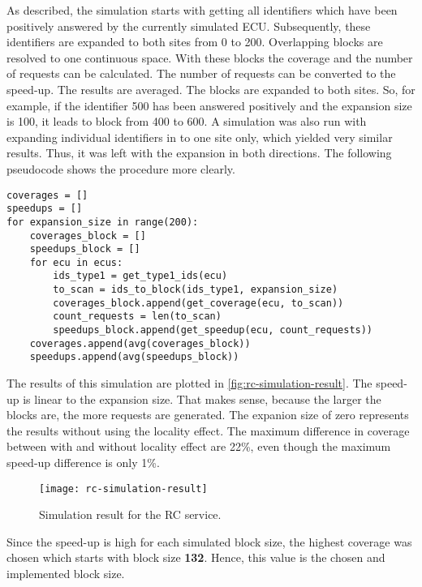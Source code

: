 As described, the simulation starts with getting all identifiers which have been positively answered by the currently simulated ECU. Subsequently, these identifiers are expanded to both sites from 0 to 200. Overlapping blocks are resolved to one continuous space. With these blocks the coverage and the number of requests can be calculated. The number of requests can be converted to the speed-up. The results are averaged.
The blocks are expanded to both sites. So, for example, if the identifier 500 has been answered positively and the expansion size is 100, it leads to block from 400 to 600. A simulation was also run with expanding individual identifiers in to one site only, which yielded very similar results. Thus, it was left with the expansion in both directions. 
The following pseudocode shows the procedure more clearly.

\begin{samepage}
\begin{verbatim}
coverages = []
speedups = []
for expansion_size in range(200):
    coverages_block = []
    speedups_block = []
    for ecu in ecus:
        ids_type1 = get_type1_ids(ecu)
        to_scan = ids_to_block(ids_type1, expansion_size)
        coverages_block.append(get_coverage(ecu, to_scan))
        count_requests = len(to_scan)
        speedups_block.append(get_speedup(ecu, count_requests))
    coverages.append(avg(coverages_block))
    speedups.append(avg(speedups_block))
\end{verbatim}
\end{samepage}

The results of this simulation are plotted in \autoref{fig:rc-simulation-result}. The speed-up is linear to the expansion size. That makes sense, because the larger the blocks are, the more requests are generated. The expanion size of zero represents the results without using the locality effect. The maximum difference in coverage between with and without locality effect are 22\%, even though the maximum speed-up difference is only 1\%.

\begin{figure}[h]
    \centering
    \texttt{[image: rc-simulation-result]}
    \caption{Simulation result for the RC service.}
    \label{fig:rc-simulation-result}
\end{figure}

Since the speed-up is high for each simulated block size, the highest coverage was chosen which starts with block size \textbf{132}. Hence, this value is the chosen and implemented block size.


